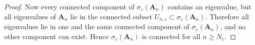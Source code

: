 \documentclass[11pt]{article}
\newcommand{\eps}{\varepsilon}
\newcommand{\sig}{\sigma}
\newcommand{\conn}{\mathrm{c}}
\newcommand{\matA}{\mathbf{A}}
\begin{document}
\begin{proof}
Now every connected component of $\sig_\eps(\matA_n)$ contains an eigenvalue, but
all eigenvalues of $\matA_n$ lie in the connected subset
$U_{n,\eps}\subset\sig_\eps(\matA_n)$. Therefore all eigenvalues lie in one and
the same connected component of $\sig_\eps(\matA_n)$, and no other component can
exist. Hence $\sig_\eps(\matA_n)$ is connected for all $n\ge N_\conn$.
\end{proof}
\end{document}
